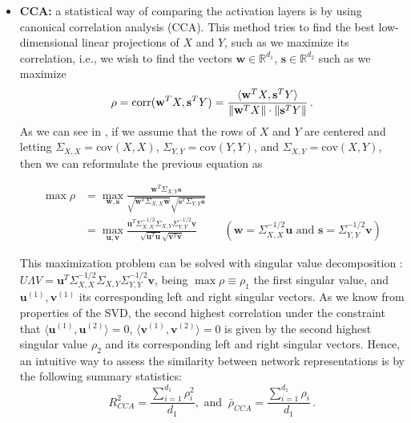 \documentclass[../main.tex]{subfiles}
\begin{document}
\begin{itemize}
    \item \textbf{CCA:} a statistical way of comparing the activation layers is by using canonical correlation analysis (CCA). This method tries to find the best low-dimensional linear projections of $X$ and $Y$, such as we maximize its correlation, i.e., we wish to find the vectors $\mathbf{w} \in \mathbb{R}^{d_1}$, $\mathbf{s} \in \mathbb{R}^{d_2}$ such as we maximize
    \[
    \rho = \text{corr}(\mathbf{w}^T X, \mathbf{s}^T Y ) = \frac{\langle \mathbf{w}^T X, \mathbf{s}^T Y \rangle}{\lVert\mathbf{w}^T X\rVert \cdot \lVert\mathbf{s}^T Y\rVert}\,.
    \]
    As we can see in \cite{morcos_insights_2018}, if we assume that the rows of $X$ and $Y$ are centered and letting $\Sigma_{X, X}= \text{cov}(X,X)$, $\Sigma_{Y, Y}= \text{cov}(Y,Y)$, and $\Sigma_{X, Y}= \text{cov}(X, Y)$, then we can reformulate the previous equation as

    \begin{align*}
    \max \rho &= \max_{\mathbf{w, s}} \frac{\mathbf{w}^T \Sigma_{X,Y} \mathbf{s}}{\sqrt{\mathbf{w}^T \Sigma_{X, X} \mathbf{w}} \sqrt{\mathbf{s}^T \Sigma_{Y, Y} \mathbf{s}}}\\
    &= \max_{\mathbf{u, v}} \frac{\mathbf{u}^T \Sigma_{X,X}^{-1/2} \Sigma_{X,Y} \Sigma_{Y,Y}^{-1/2} \mathbf{v}}{\sqrt{\mathbf{u}^T \mathbf{u}} \sqrt{\mathbf{v}^T \mathbf{v}}} && \left( \mathbf{w}= \Sigma_{X,X}^{-1/2} \mathbf{u} \text{ and } \mathbf{s} =  \Sigma_{Y,Y}^{-1/2} \mathbf{v} \right) 
    \end{align*}

    This maximization problem can be solved with singular value decomposition \cite{morcos_insights_2018}: $U \Lambda V =  \mathbf{u}^T \Sigma_{X,X}^{-1/2} \Sigma_{X,Y} \Sigma_{Y,Y}^{-1/2} \mathbf{v}$, being $\max \rho \equiv \rho_1$ the first singular value, and $\mathbf{u}^{(1)}, \mathbf{v}^{(1)}$ its corresponding left and right singular vectors. As we know from properties of the SVD, the second highest correlation under the constraint that $\langle \mathbf{u}^{(1)}, \mathbf{u}^{(2)} \rangle=0$, $\langle \mathbf{v}^{(1)}, \mathbf{v}^{(2)} \rangle=0$ is given by the second highest singular value $\rho_2$ and its corresponding left and right singular vectors. Hence, an intuitive way to assess the similarity between network representations is by the following summary statistics:
    \[
        R_{CCA}^2 = \frac{\sum_{i=1}^{d_1}\rho_i^2}{d_1},\text{ and }\ 
        \bar{\rho}_{CCA} = \frac{\sum_{i=1}^{d_1}\rho_i}{d_1}\,.
    \]


\end{itemize}
\end{document}
